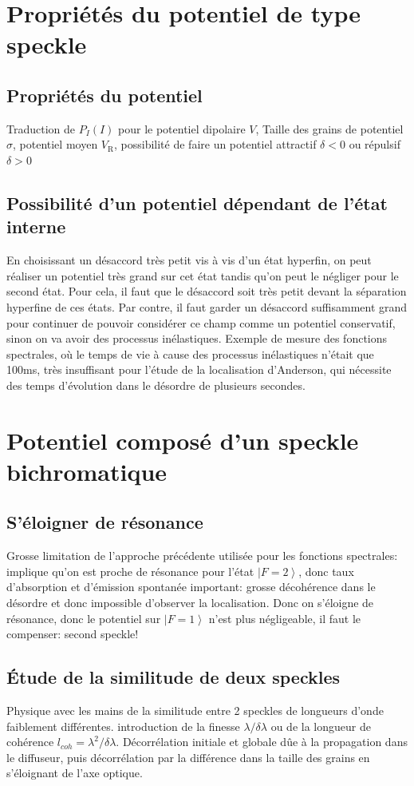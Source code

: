 \section{Propriétés du potentiel de type speckle}
\subsection{Propriétés du potentiel}
Traduction de $P_I(I)$ pour le potentiel dipolaire $V$, Taille des grains de potentiel $\sigma$, potentiel moyen $V_{\mathrm{R}}$, possibilité de faire un potentiel attractif $\delta <0$ ou répulsif $\delta > 0$
\subsection{Possibilité d'un potentiel dépendant de l'état interne}
En choisissant un désaccord très petit vis à vis d'un état hyperfin, on peut réaliser un potentiel très grand sur cet état tandis qu'on peut le négliger pour le second état. Pour cela, il faut que le désaccord soit très petit devant la séparation hyperfine de ces états. Par contre, il faut garder un désaccord suffisamment grand pour continuer de pouvoir considérer ce champ comme un potentiel conservatif, sinon on va avoir des processus inélastiques. Exemple de mesure des fonctions spectrales, où le temps de vie à cause des processus inélastiques n'était que 100ms, très insuffisant pour l'étude de la localisation d'Anderson, qui nécessite des temps d'évolution dans le désordre de plusieurs secondes.

\section{Potentiel composé d'un speckle bichromatique}
\subsection{S'éloigner de résonance}
Grosse limitation de l'approche précédente utilisée pour les fonctions spectrales: implique qu'on est proche de résonance pour l'état $\left| F=2 \right\rangle$, donc taux d'absorption et d'émission spontanée important: grosse décohérence dans le désordre et donc impossible d'observer la localisation.
Donc on s'éloigne de résonance, donc le potentiel sur $\left| F=1 \right\rangle$ n'est plus négligeable, il faut le compenser: second speckle! 
\subsection{Étude de la similitude de deux speckles}
Physique avec les mains de la similitude entre 2 speckles de longueurs d'onde faiblement différentes. introduction de la finesse $\lambda / \delta\lambda$ ou de la longueur de cohérence $l_{coh}=\lambda^2/\delta\lambda$.
Décorrélation initiale et globale dûe à la propagation dans le diffuseur, puis décorrélation par la différence dans la taille des grains en s'éloignant de l'axe optique.
